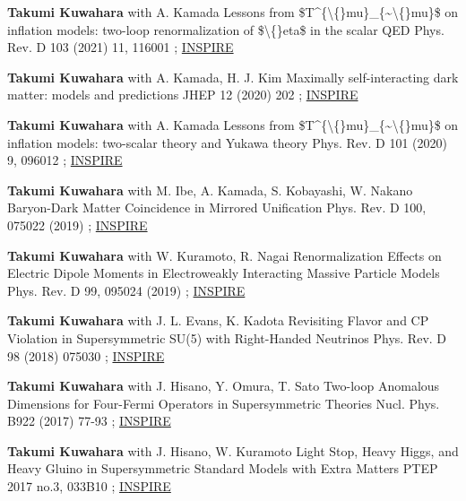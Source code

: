 \begin{publist}
\pubentry
  {\textbf{Takumi Kuwahara} with A. Kamada}
  {Lessons from \$T\textasciicircum{}\{\textbackslash\{\}mu\}\_\{\textasciitilde{}\textbackslash\{\}mu\}\$ on inflation models: two-loop renormalization of \$\textbackslash\{\}eta\$ in the scalar QED}
  {Phys. Rev. D 103 (2021) 11, 116001}
  {; \href{https://inspirehep.net/literature/1753455}{INSPIRE}}

\pubentry
  {\textbf{Takumi Kuwahara} with A. Kamada, H. J. Kim}
  {Maximally self-interacting dark matter: models and predictions}
  {JHEP 12 (2020) 202}
  {; \href{https://inspirehep.net/literature/1809511}{INSPIRE}}

\pubentry
  {\textbf{Takumi Kuwahara} with A. Kamada}
  {Lessons from \$T\textasciicircum{}\{\textbackslash\{\}mu\}\_\{\textasciitilde{}\textbackslash\{\}mu\}\$ on inflation models: two-scalar theory and Yukawa theory}
  {Phys. Rev. D 101 (2020) 9, 096012}
  {; \href{https://inspirehep.net/literature/1753398}{INSPIRE}}

\pubentry
  {\textbf{Takumi Kuwahara} with M. Ibe, A. Kamada, S. Kobayashi, W. Nakano}
  {Baryon-Dark Matter Coincidence in Mirrored Unification}
  {Phys. Rev. D 100, 075022 (2019)}
  {; \href{https://inspirehep.net/literature/1742791}{INSPIRE}}

\pubentry
  {\textbf{Takumi Kuwahara} with W. Kuramoto, R. Nagai}
  {Renormalization Effects on Electric Dipole Moments in Electroweakly Interacting Massive Particle Models}
  {Phys. Rev. D 99, 095024 (2019)}
  {; \href{https://inspirehep.net/literature/1720283}{INSPIRE}}

\pubentry
  {\textbf{Takumi Kuwahara} with J. L. Evans, K. Kadota}
  {Revisiting Flavor and CP Violation in Supersymmetric SU(5) with Right-Handed Neutrinos}
  {Phys. Rev. D 98 (2018) 075030}
  {; \href{https://inspirehep.net/literature/1683457}{INSPIRE}}

\pubentry
  {\textbf{Takumi Kuwahara} with J. Hisano, Y. Omura, T. Sato}
  {Two-loop Anomalous Dimensions for Four-Fermi Operators in Supersymmetric Theories}
  {Nucl. Phys. B922 (2017) 77-93}
  {; \href{https://inspirehep.net/literature/1519175}{INSPIRE}}

\pubentry
  {\textbf{Takumi Kuwahara} with J. Hisano, W. Kuramoto}
  {Light Stop, Heavy Higgs, and Heavy Gluino in Supersymmetric Standard Models with Extra Matters}
  {PTEP 2017 no.3, 033B10}
  {; \href{https://inspirehep.net/literature/1499894}{INSPIRE}}


\end{publist}
